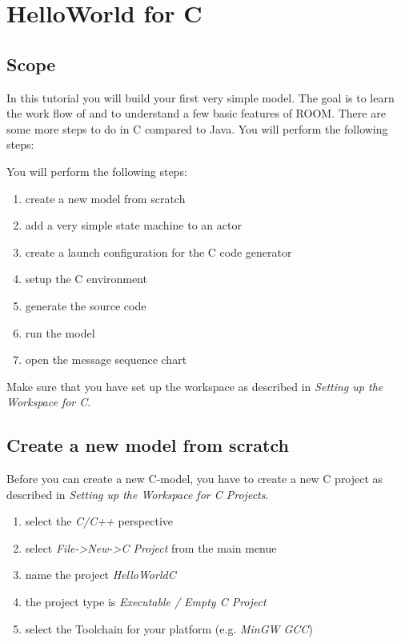 \section{HelloWorld for C}

\subsection{Scope}

In this tutorial you will build your first very simple \eTrice{} model. The goal is to learn the work flow of 
\eTrice{} and to understand a few basic features of ROOM. There are some more steps to do 
in C compared to Java. You will perform the following steps:

You will perform the following steps:

\begin{enumerate}
\item create a new model from scratch
\item add a very simple state machine to an actor
\item create a launch configuration for the C code generator
\item setup the C environment
\item generate the source code
\item run the model
\item open the message sequence chart
\end{enumerate}

Make sure that you have set up the workspace as described in \emph{Setting up the Workspace for C}.

\subsection{Create a new model from scratch}

Before you can create a new C-model, you have to create a new C project as described in \textit{Setting up 
the Workspace for C Projects}.

\begin{enumerate}
\item select the \textit{C/C++} perspective
\item select \textit{File->New->C Project} from the main menue
\item name the project \textit{HelloWorldC} 
\item the project type is \textit{Executable / Empty C Project}
\item select the Toolchain for your platform (e.g. \textit{MinGW GCC})
\end{enumerate}

